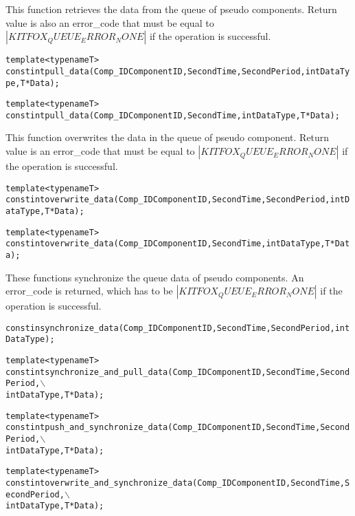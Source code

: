 \noindent
This function retrieves the data from the queue of pseudo components. 
Return value is also an error\_code that must be equal to $|KITFOX_QUEUE_ERROR_NONE|$ if the operation is successful.
{
\fontsize{10pt}{11pt}\selectfont
\begin{alltt}
template <typename T>
const int pull_data(Comp_ID ComponentID, Second Time, Second Period, int DataType, T *Data);

template <typename T>
const int pull_data(Comp_ID ComponentID, Second Time, int DataType, T *Data);
\end{alltt}
}

\noindent
This function overwrites the data in the queue of pseudo component. 
Return value is an error\_code that must be equal to $|KITFOX_QUEUE_ERROR_NONE|$ if the operation is successful.
{
\fontsize{10pt}{11pt}\selectfont
\begin{alltt}
template <typename T>
const int overwrite_data(Comp_ID ComponentID, Second Time, Second Period, int DataType, T *Data);

template <typename T>
const int overwrite_data(Comp_ID ComponentID, Second Time, int DataType, T *Data);
\end{alltt}
}

\noindent
These functions synchronize the queue data of pseudo components. 
An error\_code is returned, which has to be $|KITFOX_QUEUE_ERROR_NONE|$ if the operation is successful.
{
\fontsize{10pt}{11pt}\selectfont
\begin{alltt}
const in synchronize_data(Comp_ID ComponentID, Second Time, Second Period, int DataType);

template <typename T>
const int synchronize_and_pull_data(Comp_ID ComponentID, Second Time, Second Period,\(\backslash\)
                                    int DataType, T *Data);
                                    
template <typename T>
const int push_and_synchronize_data(Comp_ID ComponentID, Second Time, Second Period,\(\backslash\)
                                    int DataType, T *Data);
                                    
template <typename T>
const int overwrite_and_synchronize_data(Comp_ID ComponentID, Second Time, Second Period,\(\backslash\)
                                         int DataType, T *Data);
\end{alltt}
}

